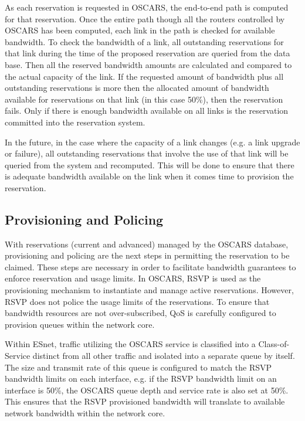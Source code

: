 \documentclass[conference]{IEEEtran}
\begin{document}
As each reservation is requested in OSCARS, the end-to-end path is
computed for that reservation. Once the entire path though all the routers
controlled by OSCARS has been computed, each link in the path is checked for
available bandwidth. To check the bandwidth of a link, all outstanding
reservations for that link during the time of the proposed reservation are
queried from the data base. Then all the reserved bandwidth amounts are
calculated and compared to the actual capacity of the link. If the requested
amount of bandwidth plus all outstanding reservations is more then the 
allocated amount of bandwidth available for reservations on that link (in 
this case 50\%), then the reservation fails. Only if there is enough bandwidth 
available on all links is the reservation committed into the reservation 
system.

In the future, in the case where the capacity of a link changes (e.g. a link 
upgrade or failure), all outstanding reservations
that involve the use of that link will be queried from the system and 
recomputed.
This will be done to ensure that there is adequate bandwidth available on the
link when it comes time to provision the reservation.

\subsection{Provisioning and Policing}
With reservations (current and advanced) managed by the OSCARS database, 
provisioning and policing are the next steps in permitting the reservation to
be claimed. These steps are necessary in order to facilitate bandwidth 
guarantees to enforce reservation and usage limits.  In OSCARS, RSVP is used 
as the provisioning mechanism to instantiate and manage active reservations. 
However, RSVP does not police the usage limits of the reservations.  To
ensure that bandwidth resources are not over-subscribed, QoS is carefully 
configured to provision queues within the network core.

Within ESnet, traffic 
utilizing the OSCARS service is classified into a Class-of-Service distinct 
from all other traffic and isolated into a separate queue by itself.  The size 
and transmit rate of this queue is configured to match the RSVP bandwidth 
limits on each interface, e.g. if the RSVP bandwidth limit on an interface is 
50\%, the OSCARS queue depth and service rate is also set at 50\%.  This 
ensures that the RSVP provisioned bandwidth will translate to available 
network bandwidth within the network core.
\end{document}
